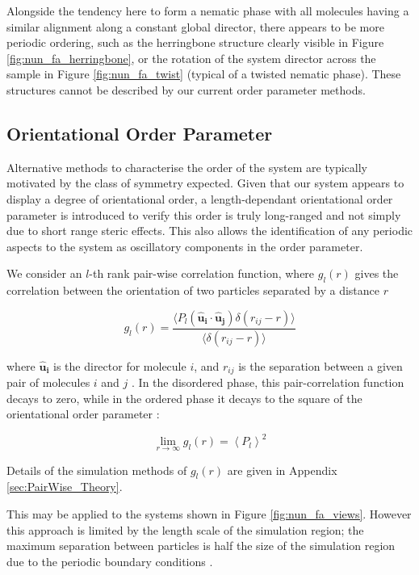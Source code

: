 \documentclass[11pt, a4paper]{article} %
\begin{document}
Alongside the tendency here to form a nematic phase with all molecules having a similar alignment along a constant global director, there appears to be more periodic ordering, such as the herringbone structure clearly visible in Figure \ref{fig:nun_fa_herringbone}, or the rotation of the system director across the sample in Figure \ref{fig:nun_fa_twist} (typical of a twisted nematic phase). These structures cannot be described by our current order parameter methods.


\subsection{Orientational Order Parameter} \label{sec:PairWise_Application}
Alternative methods to characterise the order of the system are typically motivated by the class of symmetry expected. Given that our system appears to display a degree of orientational order, a length-dependant orientational order parameter is introduced to verify this order is truly long-ranged and not simply due to short range steric effects. This also allows the identification of any periodic aspects to the system as oscillatory components in the order parameter.

We consider an $l$-th rank pair-wise correlation function, where $g_{l}(r)$ gives the correlation between the orientation of two particles separated by a distance $r$

\begin{equation} \label{eq:PairWise_eq}
g_{l}(r) = \frac{\langle P_{l}(\boldsymbol{\hat{u}_{i}}\cdot \boldsymbol{\hat{u}_{j}}) \delta(r_{ij}-r)\rangle}{\langle  \delta(r_{ij}-r) \rangle}
\end{equation}

where $\boldsymbol{\hat{u}_{i}}$ is the director for molecule $i$, and $r_{ij}$ is the separation between a given pair of molecules $i$ and $j$ \cite{Zannoni1979}. In the disordered phase, this pair-correlation function decays to zero, while in the ordered phase it decays to the square of the orientational order parameter \cite{Frenkel1985b}:

\begin{equation}
\lim_{r \to \infty}g_{l}(r) = \left\langle P_{l} \right\rangle ^{2}
\end{equation}

Details of the simulation methods of $g_{l}(r)$ are given in Appendix \ref{sec:PairWise_Theory}. 

This may be applied to the systems shown in Figure \ref{fig:nun_fa_views}. However this approach is limited by the length scale of the simulation region; the maximum separation between particles is half the size of the simulation region due to the periodic boundary conditions \cite{Frenkel1985c}.
\end{document}
